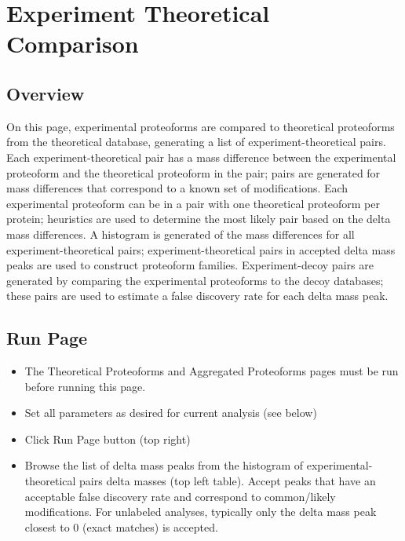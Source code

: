 
\section{Experiment Theoretical Comparison}

\subsection{Overview}

On this page, experimental proteoforms are compared to theoretical proteoforms from the theoretical database, generating a list of experiment-theoretical pairs. Each experiment-theoretical pair has a mass difference between the experimental proteoform and the theoretical proteoform in the pair; pairs are generated for mass differences that correspond to a known set of modifications. Each experimental proteoform can be in a pair with one theoretical proteoform per protein; heuristics are used to determine the most likely pair based on the delta mass differences. A histogram is generated of the mass differences for all experiment-theoretical pairs; experiment-theoretical pairs in accepted delta mass peaks are used to construct proteoform families. Experiment-decoy pairs are generated by comparing the experimental proteoforms to the decoy databases; these pairs are used to estimate a false discovery rate for each delta mass peak. 

\subsection{Run Page}
\begin{itemize}
\item The Theoretical Proteoforms and Aggregated Proteoforms pages must be run before running this page.
\item Set all parameters as desired for current analysis (see below)
\item Click Run Page button (top right)
\item Browse the list of delta mass peaks from the histogram of experimental-theoretical pairs delta masses (top left table). Accept peaks that have an acceptable false discovery rate and correspond to common/likely modifications. For unlabeled analyses, typically only the delta mass peak closest to 0 (exact matches) is accepted. 
\end{itemize}

